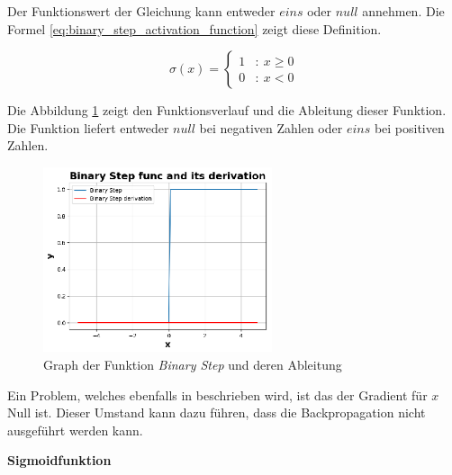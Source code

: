 Der Funktionswert der Gleichung kann entweder $eins$ oder $null$ annehmen. Die Formel \ref{eq:binary_step_activation_function} zeigt diese Definition.

\begin{equation}\label{eq:binary_step_activation_function}
	\sigma (x) = \left\{
	\begin{array}{cl}
		1 & : \ x \geq 0 \\
		0 & : \ x < 0
	\end{array}
	\right.
\end{equation}

Die Abbildung \ref{img:binary_step_func_graph} zeigt den Funktionsverlauf und die Ableitung dieser Funktion. Die Funktion liefert entweder $null$ bei negativen Zahlen oder $eins$ bei positiven Zahlen.

\begin{figure}[!ht]
	\includegraphics[width=0.6\textwidth]{content/chapter_basics/plots/binary_step_func_plot.eps}
	\centering
	\caption{Graph der Funktion \textit{Binary Step} und deren Ableitung}
	\label{img:binary_step_func_graph}
\end{figure}

Ein Problem, welches ebenfalls in \cite[311-312]{sharma-2020} beschrieben wird, ist das der Gradient für $x$ Null ist. Dieser Umstand kann dazu führen, dass die Backpropagation nicht ausgeführt werden kann.\vspace{0.2cm}

%
\textbf{Sigmoidfunktion}\vspace{0.2cm}

